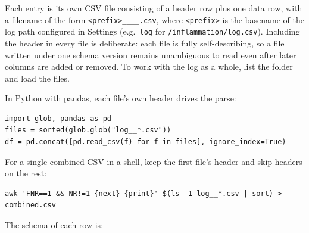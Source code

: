\documentclass[11pt,a4paper]{article}
\begin{document}
Each entry is its own CSV file consisting of a header row plus one data row, with a filename of the form \texttt{<prefix>\_\_<entry-date>\_\_<write-ms>.csv}, where \texttt{<prefix>} is the basename of the log path configured in Settings (e.g.\ \texttt{log} for \texttt{/inflammation/log.csv}). Including the header in every file is deliberate: each file is fully self-describing, so a file written under one schema version remains unambiguous to read even after later columns are added or removed. To work with the log as a whole, list the folder and load the files.

In Python with pandas, each file's own header drives the parse:
\begin{lstlisting}[language=shell]
import glob, pandas as pd
files = sorted(glob.glob("log__*.csv"))
df = pd.concat([pd.read_csv(f) for f in files], ignore_index=True)
\end{lstlisting}

For a single combined CSV in a shell, keep the first file's header and skip headers on the rest:
\begin{lstlisting}[language=shell]
awk 'FNR==1 && NR!=1 {next} {print}' $(ls -1 log__*.csv | sort) > combined.csv
\end{lstlisting}

The schema of each row is:
\end{document}

